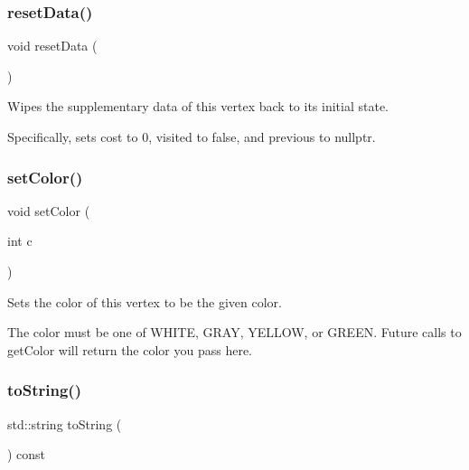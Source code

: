 \mbox{\label{classVertexGen_ab51301d11ddc80165b3b7798b866421e}} 
\subsubsection{\texorpdfstring{reset\+Data()}{resetData()}}
{\footnotesize\ttfamily void reset\+Data (\begin{DoxyParamCaption}{ }\end{DoxyParamCaption})}



Wipes the supplementary data of this vertex back to its initial state. 

Specifically, sets cost to 0, visited to false, and previous to nullptr. \mbox{\label{classVertexGen_a5551ca73ea9118c8dc6dbfd26e72e3d6}} 
\subsubsection{\texorpdfstring{set\+Color()}{setColor()}}
{\footnotesize\ttfamily void set\+Color (\begin{DoxyParamCaption}\item[{int}]{c }\end{DoxyParamCaption})}



Sets the color of this vertex to be the given color. 

The color must be one of W\+H\+I\+TE, G\+R\+AY, Y\+E\+L\+L\+OW, or G\+R\+E\+EN. Future calls to get\+Color will return the color you pass here. \mbox{\label{classVertexGen_a1fe5121d6528fdea3f243321b3fa3a49}} 
\subsubsection{\texorpdfstring{to\+String()}{toString()}}
{\footnotesize\ttfamily std\+::string to\+String (\begin{DoxyParamCaption}{ }\end{DoxyParamCaption}) const}



